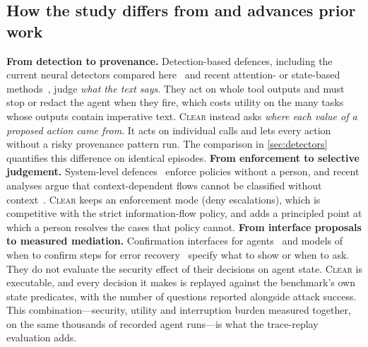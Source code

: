 \documentclass[preprint,12pt,nonatbib]{elsarticle}
\theoremstyle{remark}
\newcommand{\clear}{\textsc{Clear}}
\begin{document}
\subsection{How the study differs from and advances prior work}
\label{sec:advance}
\textbf{From detection to provenance.} Detection-based defences, including the
current neural detectors compared here~\citep{protectai2024deberta,li2025piguard}
and recent attention- or state-based methods~\citep{hung2025attentiontracker,wen2025instruction,zhong2026attention},
judge \emph{what the text says}. They act on whole tool outputs and must stop or
redact the agent when they fire, which costs utility on the many tasks whose
outputs contain imperative text. \clear{} instead asks \emph{where each value
of a proposed action came from}. It acts on individual calls and lets every
action without a risky provenance pattern run. The comparison in
\cref{sec:detectors} quantifies this difference on identical episodes.
\textbf{From enforcement to selective judgement.} System-level
defences~\citep{debenedetti2026camel,costa2025fides,shi2025progent} enforce
policies without a person, and recent analyses argue that context-dependent
flows cannot be classified without context~\citep{abdelnabi2026always}. \clear{}
keeps an enforcement mode (deny escalations), which is competitive with the strict
information-flow policy, and adds a principled point at which a person resolves
the cases that policy cannot.
\textbf{From interface proposals to measured mediation.} Confirmation interfaces
for agents~\citep{mozannar2025magentic,su2026riskcards} and models of when to
confirm steps for error recovery~\citep{zhou2026check} specify what to show or
when to ask. They do not evaluate the security effect of their decisions on
agent state. \clear{} is executable, and every decision it makes is replayed
against the benchmark's own state predicates, with the number of questions
reported alongside attack success. This combination---security, utility and interruption burden measured together,
on the same thousands of recorded agent runs---is what the trace-replay
evaluation adds.
\end{document}
